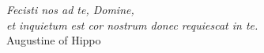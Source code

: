
	
\normalsize
\textit{Fecisti nos ad te, Domine,\\et inquietum est cor nostrum donec requiescat in te.}
\\\vspace{10pt}\normalsize Augustine of Hippo

